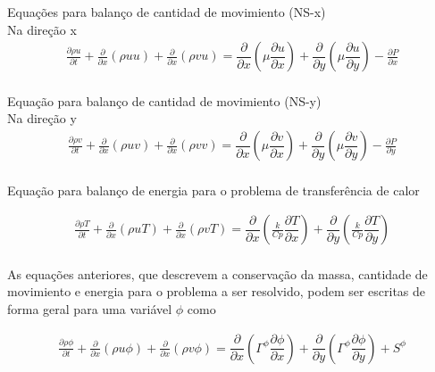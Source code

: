 \documentclass[]{article}
\begin{document}
Equações para balanço de cantidad de movimiento (NS-x)\\
Na direção x
\begin{equation}
	\begin{aligned}
		\frac{\partial \rho u}{\partial t} + \frac{\partial}{\partial x}(\rho uu) + \frac{\partial}{\partial x}(\rho vu) = \dfrac{\partial}{\partial x}(\mu\dfrac{\partial u}{\partial x}) + \dfrac{\partial}{\partial y}(\mu\dfrac{\partial u}{\partial y}) -\frac{\partial P}{\partial x}
	\end{aligned}
	\label{eq:2}	
\end{equation}\\

Equação para balanço de cantidad de movimiento (NS-y)\\
Na direção y
\begin{equation}
	\begin{aligned}
		\frac{\partial \rho v}{\partial t} + \frac{\partial}{\partial x}(\rho uv) + \frac{\partial}{\partial x}(\rho vv) = \dfrac{\partial}{\partial x}(\mu\dfrac{\partial v}{\partial x}) + \dfrac{\partial}{\partial y}(\mu\dfrac{\partial v}{\partial y}) -\frac{\partial P}{\partial y}
	\end{aligned}
	\label{eq:3}	
\end{equation}\\

Equação para balanço de energia para o problema de transferência de calor
 
\begin{equation}
	\begin{aligned}
		\frac{\partial \rho T}{\partial t} + \frac{\partial}{\partial x}(\rho uT) + \frac{\partial}{\partial x}(\rho vT) = \dfrac{\partial}{\partial x}(\frac{k}{Cp} \dfrac{\partial T}{\partial x}) + \dfrac{\partial}{\partial y}(\frac{k}{Cp}\dfrac{\partial T}{\partial y})
	\end{aligned}
	\label{eq:4}	
\end{equation}\\

As equações anteriores, que descrevem a conservação da massa, cantidade de movimiento e energia para o problema a ser resolvido, podem ser escritas de forma geral para uma variável $\phi$ como

\begin{equation}
	\begin{aligned}
		\frac{\partial \rho \phi}{\partial t} + \frac{\partial}{\partial x}(\rho u\phi) + \frac{\partial}{\partial x}(\rho v\phi) = \dfrac{\partial}{\partial x}(\varGamma^{\phi} \dfrac{\partial \phi}{\partial x}) + \dfrac{\partial}{\partial y}(\varGamma^{\phi} \dfrac{\partial \phi}{\partial y}) + S^{\phi}
	\end{aligned}
	\label{eq:5}	
\end{equation}\\
\end{document}
